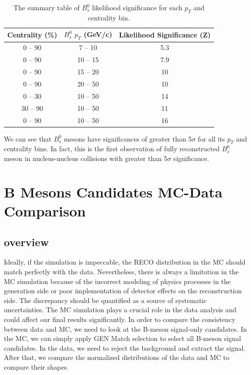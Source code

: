 \begin{table}[h]
\begin{center}
\caption{The summary table of $B^0_s$ likelihood significance for each $p_T$ and centrality bin.}
\vspace{1em}
\label{BsSig}
  \begin{tabular}{ |c|c|c|}
    \hline 
Centrality (\%) & $B^0_s$ $p_T$ (GeV/c) & Likelihood Significance (Z)  \\
     \hline
0 -- 90 & 7 -- 10 & 5.3 \\
0 -- 90 & 10 -- 15 & 7.9 \\
0 -- 90 & 15 -- 20 & 10 \\
0 -- 90 & 20 -- 50 & 10 \\
0 -- 30 & 10 -- 50 &  14 \\
30 -- 90 & 10 -- 50 &  11\\
0 -- 90 & 10 -- 50 & 16 \\
     \hline
    \hline
\end{tabular}
\end{center}
\end{table}



We can see that $B^0_s$ mesons have significances of greater than 5$\sigma$ for all its $p_T$ and centrality bins. In fact, this is the first observation of fully reconstructed $B^0_s$ meson in nucleus-nucleus collisions with greater than 5$\sigma$ significance. 

\section{B Mesons Candidates MC-Data Comparison}

\subsection{overview}

Ideally, if the simulation is impeccable, the RECO distribution in the MC should match perfectly with the data. Nevertheless, there is always a limitation in the MC simulation because of the incorrect modeling of physics processes in the generation side or poor implementation of detector effects on the reconstruction side. The discrepancy should be quantified as a source of systematic uncertainties. The MC simulation plays a crucial role in the data analysis and could affect our final results significantly. In order to compare the consistency between data and MC, we need to look at the B-meson signal-only candidates. In the MC, we can simply apply GEN Match selection to select all B-meson signal candidates. In the data, we need to reject the background and extract the signal. After that, we compare the normalized distributions of the data and MC to compare their shapes. 

